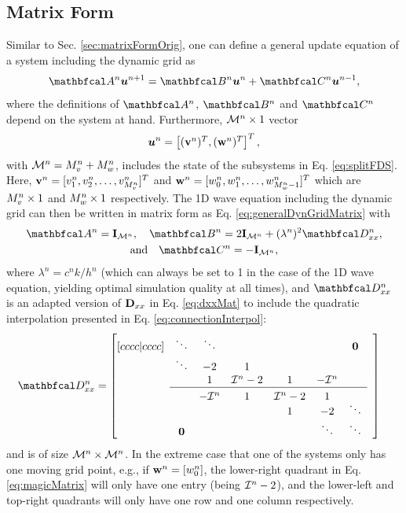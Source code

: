\documentclass[fleqn]{jaes}
\begin{document}
\subsection{Matrix Form}\label{sec:matrixForm}
Similar to Sec. \ref{sec:matrixFormOrig}, one can define a general update equation of a system including the dynamic grid as
\begin{equation}\label{eq:generalDynGridMatrix}
    \AA \uStack^{n+1} = \BB \uStack^n + \CC \uStack^{n-1},
\end{equation}
where the definitions of $\AA$, $\BB$ and $\CC$ depend on the system at hand.
Furthermore, ${\mathcal{M}^n} \times 1$ vector
\begin{equation}\label{eq:uStack}
    \uStack^n = \begin{bmatrix}
    (\v^n)^T, (\w^n)^T
    \end{bmatrix}^T,
\end{equation}
with ${\mathcal{M}^n} = M_v^n + M_w^n$, includes the state of the subsystems in Eq. \eqref{eq:splitFDS}. Here, $\mathbf{v}^n = [v_1^n, v_2^n, \hdots, v_{M_v^n}^n]^T$ and $\mathbf{w}^n = [w_0^n, w_1^n, \hdots, w_{M_w^n-1}^n]^T$ which are $M_v^n \times 1$ and $M_w^n \times 1$ respectively. 
The 1D wave equation including the dynamic grid can then be written in matrix form as Eq. \eqref{eq:generalDynGridMatrix} with
\begin{equation}\label{eq:1DwaveDynMatrix}
\begin{gathered}
    \AA = \I_{\MoneD}, \quad \BB = 2\I_\MoneD + (\lambda^n)^2\DDxx,\\
\text{and} \quad\CC = -\I_{\MoneD},
\end{gathered}
\end{equation}
where $\lambda^n = c^nk/h^n$ (which can always be set to 1 in the case of the 1D wave equation, yielding optimal simulation quality at all times), and $\DDxx$ is an adapted version of $\mathbf{D}_{xx}$ in Eq. \eqref{eq:dxxMat} to include the quadratic interpolation presented in Eq. \eqref{eq:connectionInterpol}:
\begin{equation}\label{eq:magicMatrix}
    \!\!\!\!\!\!\DDxx = \begin{bmatrix}[cccc|cccc]
     & \ddots  &\ddots & & & & \mathbf{0} & \\
       & \ddots & -2 & 1 & & & & \\
      & & 1 & \Aterm -2 & 1 & -\Aterm & \\ \cline{2-7}
      & & & & & & & \\[-0.9em]
      & & -\Aterm & 1 & \Aterm -2 & 1 & & \\[-0.5em]
         & & & &1 & -2 & \ddots  \\
         & \mathbf{0} & &  &  &\ddots & \ddots &
    \end{bmatrix}
\end{equation}
and is of size ${\mathcal{M}^n} \times {\mathcal{M}^n}$. In the extreme case that one of the systems only has one moving grid point, e.g., if $\mathbf{w}^n =[w_0^n]$, the lower-right quadrant in Eq. \eqref{eq:magicMatrix} will only have one entry (being $\mathcal{I}^n-2$), and the lower-left and top-right quadrants will only have one row and one column respectively. 
\end{document}
